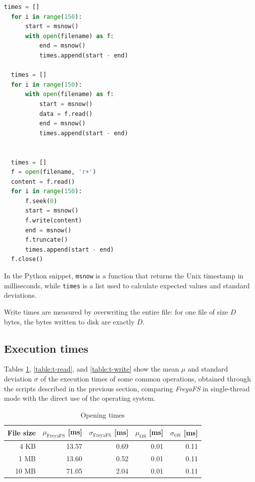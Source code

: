 \documentclass[a4paper,12pt,twoside,openright]{report}
\begin{document}
  \clearpage
  \begin{lstlisting}[language=Python]
  times = []
  for i in range(150):
      start = msnow()
      with open(filename) as f:
          end = msnow()
          times.append(start - end)

  times = []
  for i in range(150):
      with open(filename) as f:
          start = msnow()
          data = f.read()
          end = msnow()
          times.append(start - end)


  times = []
  f = open(filename, 'r+')
  content = f.read()
  for i in range(150):
      f.seek(0)
      start = msnow()
      f.write(content)
      end = msnow()
      f.truncate()
      times.append(start - end)
  f.close()
  \end{lstlisting}
  
  In the Python snippet, \texttt{msnow} is a function that returns the Unix timestamp in milliseconds,
  while \texttt{times} is a list used to calculate expected values and standard deviations.

  Write times are measured by overwriting the entire file: for one file of size $D$ bytes, the bytes written to disk are exactly $D$.

  \subsection{Execution times}

  Tables \ref{table:t-open}, \ref{table:t-read}, and \ref{table:t-write} show the mean $\mu$ and standard deviation $\sigma$
  of the execution times of some common operations, obtained through the scripts described
  in the previous section, comparing \textit{FreyaFS} in single-thread mode with the direct use of the operating system.

  \begin{table}[h!]
    \centering
    \begin{tabular}{|r||r|r||r|r|} 
      \hline
      File size & $\mu_\text{FreyaFS}$ [ms] & $\sigma_\text{FreyaFS}$ [ms] & $\mu_\text{OS}$ [ms] & $\sigma_\text{OS}$ [ms] \\ [0.5ex]
      \hline\hline
      4 KB & 13.57 & 0.69  & 0.01 & 0.11 \\
      \hline
       1 MB & 13.60 & 0.52 & 0.01 & 0.11 \\
      \hline
      10 MB & 71.05 & 2.04 & 0.01 & 0.11 \\
      \hline
    \end{tabular}
    \caption{Opening times}
    \label{table:t-open}
  \end{table}
\end{document}
